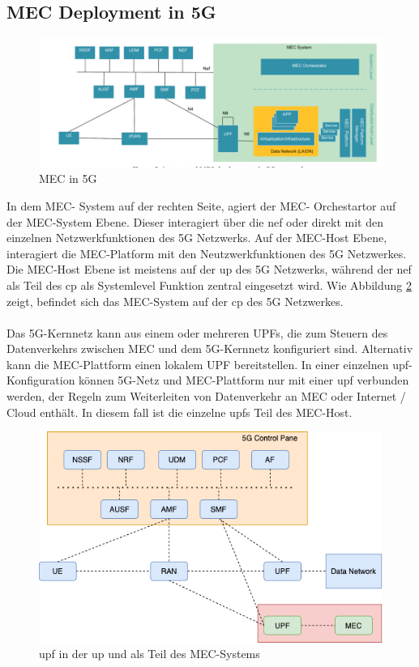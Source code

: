\documentclass[runningheads]{llncs}
\numberwithin{figure}{section}
\begin{document}
\subsection{MEC Deployment in 5G}
\begin{figure}
  \includegraphics[width=\linewidth]{images/5GMEC-System-Architecture2.png}
  \caption{MEC in 5G \cite{etsiMultiaccessEdgeComputinga}}
  \label{fig:sba2}
\end{figure}
In dem MEC- System auf der rechten Seite, agiert der MEC- Orchestartor auf der MEC-System Ebene. Dieser interagiert über die \acrshort{nef} oder
direkt mit den einzelnen Netzwerkfunktionen des 5G Netzwerks. Auf der MEC-Host Ebene, interagiert die MEC-Platform mit den Neutzwerkfunktionen des 5G Netzwerkes.
Die MEC-Host Ebene ist meistens auf der \acrshort{up} des 5G Netzwerks, während der \acrshort{nef} als Teil des \acrshort{cp} als Systemlevel 
Funktion zentral eingesetzt wird.
Wie Abbildung \ref{fig:sba2} zeigt, befindet sich das MEC-System auf der \acrshort{cp} des 5G Netzwerkes. 
\\
\\
Das 5G-Kernnetz kann aus einem oder mehreren
UPFs, die zum Steuern des Datenverkehrs zwischen MEC und dem 5G-Kernnetz konfiguriert sind.
Alternativ kann die MEC-Plattform einen lokalem UPF bereitstellen.
In einer einzelnen \acrfull{upf}-Konfiguration können 5G-Netz und MEC-Plattform nur mit einer \acrfull{upf} verbunden werden, 
der Regeln zum Weiterleiten von Datenverkehr an MEC oder Internet / Cloud enthält. In diesem fall ist die einzelne \acrshort{upf}s Teil des 
MEC-Host.
\begin{figure}
  \includegraphics[width=\linewidth]{images/5g-scenarios.png}
  \caption{\acrshort{upf} in der \acrshort{up} und als Teil des MEC-Systems}
  \label{fig:sba2}
\end{figure}
\end{document}
